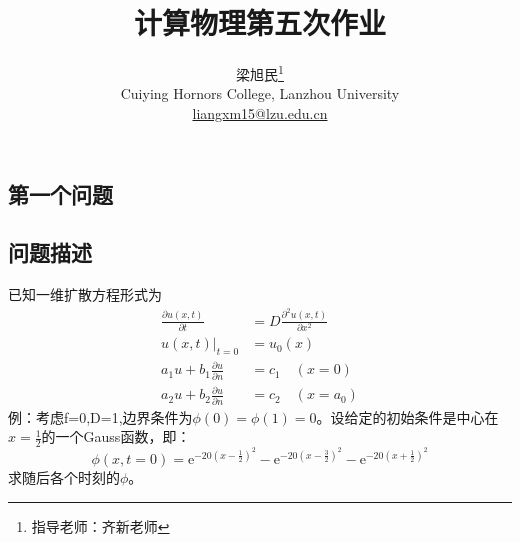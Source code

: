 \documentclass[twoside,twocolumn]{article}
\begin{document}
\begin{CJK*}{UTF8}{gkai}

\setlength{\droptitle}{-4\baselineskip} %
\pretitle{\begin{center}\Huge\bfseries} %
	\posttitle{\end{center}} %
\title{计算物理第五次作业} %
\author{
	\textsc{梁旭民}\thanks{\noindent 指导老师：齐新老师} \\[1ex] %
	\normalsize Cuiying Hornors College, Lanzhou University \\ %
	\normalsize \href{mailto:liangxm15@lzu.edu.cn}{liangxm15@lzu.edu.cn} %
}
\date{}
\renewcommand{\maketitlehookd}{
	\begin{abstract}
		本次作业学习了Crank-Nicolson 差分格式求解含时微分方程的解法，并运用该方法求解了初始条件为Gauss函数的扩散方程，并画出了该扩散方程随时间的演化。
	\end{abstract}
}
\maketitle


\section{第一个问题}
\subsection{问题描述}
已知一维扩散方程形式为
\begin{equation*}
\begin{aligned}
\frac{\partial u(x,t)}{\partial t}&=D\frac{\partial^{2}u(x,t)}{\partial x^{2}}\\
u(x,t)|_{t=0}&=u_{0}(x)\\
a_{1}u+b_{1}\frac{\partial u}{\partial n}&=c_{1}\quad (x=0)\\
a_{2}u+b_{2}\frac{\partial u}{\partial n}&=c_{2}\quad (x=a_{0})
\end{aligned}
\end{equation*}
例：考虑f=0,D=1,边界条件为$\phi(0)=\phi(1)=0$。设给定的初始条件是中心在$x=\frac{1}{2}$的一个Gauss函数，即：
\begin{equation*}
\phi(x,t=0)=\mathrm{e}^{-20(x-\frac{1}{2})^{2}}-\mathrm{e}^{-20(x-\frac{3}{2})^{2}}-\mathrm{e}^{-20(x+\frac{1}{2})^{2}}
\end{equation*}
求随后各个时刻的$\phi$。


\end{CJK*}
\end{document}
